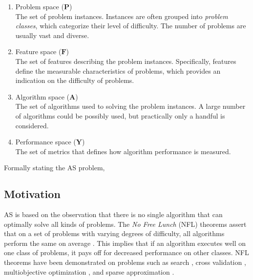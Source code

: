 \begin{enumerate}
	\item Problem space ($\mathbf{P}$) \\
	The set of problem instances. Instances are often grouped into \textit{problem classes}, which categorize their level of difficulty. The number of problems are usually vast and diverse.
	\item Feature space ($\mathbf{F}$) \\
	The set of features describing the problem instances. Specifically, features define the measurable characteristics of problems, which provides an indication on the difficulty of problems.
	\item Algorithm space ($\mathbf{A}$) \\
	The set of algorithms used to solving the problem instances. A large number of algorithms could be possibly used, but practically only a handful is considered.
	\item Performance space ($\mathbf{Y}$) \\
	The set of metrics that defines how algorithm performance is measured.
\end{enumerate}

Formally stating the AS problem, 


\subsection{Motivation}
AS is based on the observation that there is no single algorithm that can optimally solve all kinds of problems. The \textit{No Free Lunch} (NFL) theorems assert that on a set of problems with varying degrees of difficulty, all algorithms perform the same on average \citep{wolpert1997no}. This implies that if an algorithm executes well on one class of problems, it pays off for decreased performance on other classes. NFL theorems have been demonstrated on problems such as search \citep{wolpert1995no}, cross validation \citep{goutte1997note}, multiobjective optimization \citep{corne2003no}, and sparse approximation \citep{xu2012sparse}.

